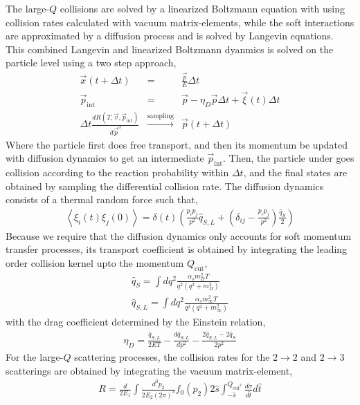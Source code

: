 The large-$Q$ collisions are solved by a linearized Boltzmann equation with using collision rates calculated with vacuum matrix-elements, while the soft interactions are approximated by a diffusion process and is solved by Langevin equations.
This combined Langevin and linearized Boltzmann dyanmics is solved on the particle level using a two step approach,
\begin{eqnarray}
\vec{x}(t+\Delta t) &=& \frac{\vec{p}}{E}\Delta t\\
\vec{p}_{\textrm{int}} &=& \vec{p} - \eta_D \vec{p} \Delta t + \vec{\xi}(t) \Delta t\\
\Delta t\frac{dR(T, \vec{v}, \vec{p}_{\textrm{int}})}{d\vec{p}^3} &\xrightarrow{\textrm{sampling}}& \vec{p}(t+\Delta t)
\end{eqnarray}
Where the particle first does free transport, and then its momentum be updated with diffusion dynamics to get an intermediate $\vec{p}_{\textrm{int}}$. 
Then, the particle under goes collision according to the reaction probability within $\Delta t$, and the final states are obtained by sampling the differential collision rate.
The diffusion dynamics consists of a thermal random force such that,
\begin{eqnarray}
\left\langle\xi_i(t)\xi_j(0)\right\rangle = \delta(t) \left(
\frac{p_i p_j}{p^2}\hat{q}_{S, L} + \left(
\delta_{ij}-\frac{p_i p_j}{p^2}
\right)\frac{\hat{q}_S}{2} 
\right)
\end{eqnarray}
Because we require that the diffusion dynamics only accounts for soft momentum transfer processes, its transport coefficient is obtained by integrating the leading order collision kernel upto the momentum $Q_{\textrm{cut}}$,
\begin{eqnarray}
\hat{q}_S = \int dq^2 \frac{\alpha_s m_D^2 T}{q^2 (q^2+m_D^2)} 
\label{eq:qS} \\
\hat{q}_{S,L} = \int dq^2 \frac{\alpha_s m_\infty^2 T}{q^2 (q^2+m_\infty^2)}
\label{eq:qSL} 
\end{eqnarray}
with the drag coefficient determined by the Einstein relation,
\begin{eqnarray}
\eta_D = \frac{\hat{q}_{S,L}}{2ET} - \frac{d\hat{q}_{S,L}}{dp^2} - \frac{2\hat{q}_{S,L} - 2\hat{q}_S}{2p^2}
\end{eqnarray}
For the large-$Q$ scattering processes, the collision rates for the $2\rightarrow 2$ and $2\rightarrow 3$ scatterings are obtained by integrating the vacuum matrix-element,
\begin{eqnarray}
R = \frac{d}{2E_1}\int  \frac{d^3p_2}{2E_2(2\pi)^3} f_0(p_2)2\hat{s} \int_{-\hat{s}}^{Q_{\textrm{cut}^2}}\frac{d\sigma}{d\hat{t}}d\hat{t}
\end{eqnarray}
